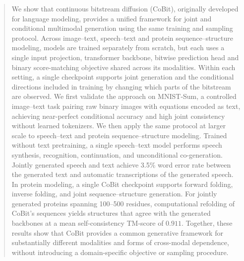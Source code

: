 \begin{abstract}
We show that continuous bitstream diffusion (CoBit), originally developed for language modeling, provides a unified framework for joint and conditional multimodal generation using the same training and sampling protocol. Across image--text, speech--text and protein sequence--structure modeling, models are trained separately from scratch, but each uses a single input projection, transformer backbone, bitwise prediction head and binary score-matching objective shared across its modalities. Within each setting, a single checkpoint supports joint generation and the conditional directions included in training by changing which parts of the bitstream are observed. We first validate the approach on MNIST-Sum, a controlled image--text task pairing raw binary images with equations encoded as text, achieving near-perfect conditional accuracy and high joint consistency without learned tokenizers. We then apply the same protocol at larger scale to speech--text and protein sequence--structure modeling. Trained without text pretraining, a single speech--text model performs speech synthesis, recognition, continuation, and unconditional co-generation. Jointly generated speech and text achieve 3.5\% word error rate between the generated text and automatic transcriptions of the generated speech. In protein modeling, a single CoBit checkpoint supports forward folding, inverse folding, and joint sequence--structure generation. For jointly generated proteins spanning 100--500 residues, computational refolding of CoBit's sequences yields structures that agree with the generated backbones at a mean self-consistency TM-score of $0.911$. Together, these results show that CoBit provides a common generative framework for substantially different modalities and forms of cross-modal dependence, without introducing a domain-specific objective or sampling procedure.
\end{abstract}